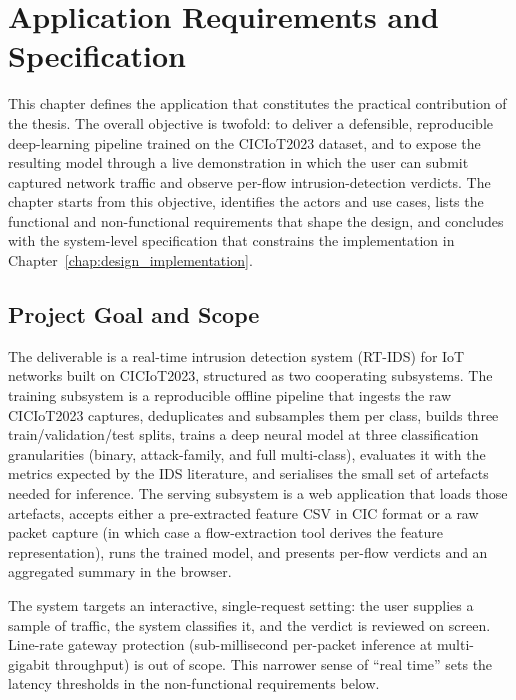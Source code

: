 \chapter{Application Requirements and Specification}
\label{chap:requirements}

\par This chapter defines the application that constitutes the practical contribution of the thesis. The overall objective is twofold: to deliver a defensible, reproducible deep-learning pipeline trained on the CICIoT2023 dataset, and to expose the resulting model through a live demonstration in which the user can submit captured network traffic and observe per-flow intrusion-detection verdicts. The chapter starts from this objective, identifies the actors and use cases, lists the functional and non-functional requirements that shape the design, and concludes with the system-level specification that constrains the implementation in Chapter~\ref{chap:design_implementation}.

\section{Project Goal and Scope}
\label{sec:project_goal}

\par The deliverable is a real-time intrusion detection system (RT-IDS) for IoT networks built on CICIoT2023, structured as two cooperating subsystems. The training subsystem is a reproducible offline pipeline that ingests the raw CICIoT2023 captures, deduplicates and subsamples them per class, builds three train/validation/test splits, trains a deep neural model at three classification granularities (binary, attack-family, and full multi-class), evaluates it with the metrics expected by the IDS literature, and serialises the small set of artefacts needed for inference. The serving subsystem is a web application that loads those artefacts, accepts either a pre-extracted feature CSV in CIC format or a raw packet capture (in which case a flow-extraction tool derives the feature representation), runs the trained model, and presents per-flow verdicts and an aggregated summary in the browser.

\par The system targets an interactive, single-request setting: the user supplies a sample of traffic, the system classifies it, and the verdict is reviewed on screen. Line-rate gateway protection (sub-millisecond per-packet inference at multi-gigabit throughput) is out of scope. This narrower sense of \enquote{real time} sets the latency thresholds in the non-functional requirements below.

